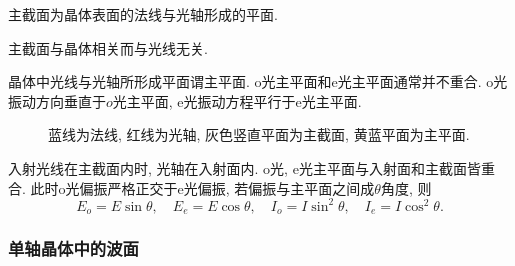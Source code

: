 \documentclass{ctexart}
\begin{document}
\par
主截面为晶体表面的法线与光轴形成的平面.
\begin{pitfall}
    主截面与晶体相关而与光线无关.
\end{pitfall}
\par
晶体中光线与光轴所形成平面谓主平面. o光主平面和e光主平面通常并不重合. o光振动方向垂直于$o$光主平面, e光振动方程平行于e光主平面.
\par
\begin{figure}[ht]
    \centering
    \caption{蓝线为法线, 红线为光轴, 灰色竖直平面为主截面, 黄蓝平面为主平面.}
\end{figure}
\begin{sample}
    \begin{ex}
        入射光线在主截面内时, 光轴在入射面内. o光, e光主平面与入射面和主截面皆重合. 此时o光偏振严格正交于e光偏振, 若偏振与主平面之间成$\theta$角度, 则
        \[ E_o = E\sin\theta,\quad E_e = E\cos\theta,\quad I_o = I\sin^2\theta,\quad I_e = I\cos^2\theta. \]
    \end{ex}
\end{sample}


\subsubsection{单轴晶体中的波面} %
\label{ssub:单轴晶体中的波面}
\end{document}
